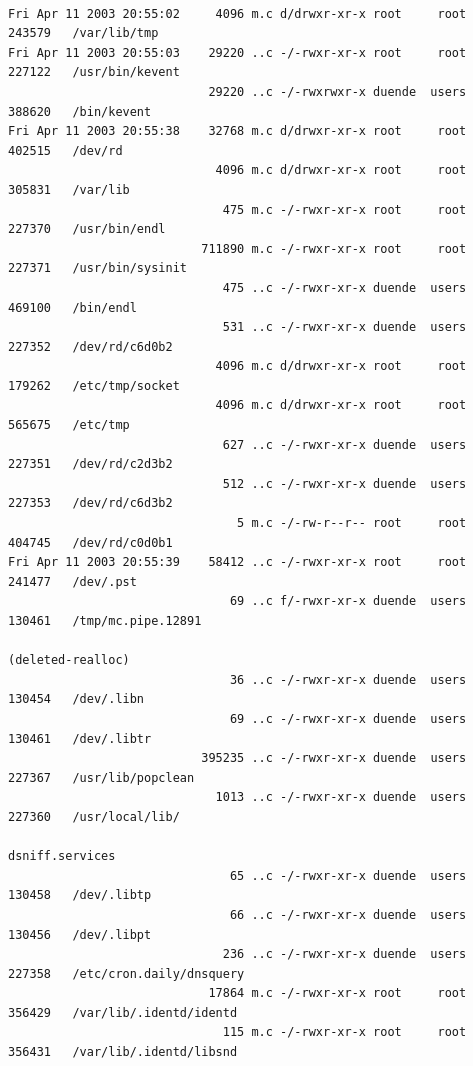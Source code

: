 {\footnotesize
\begin{lstlisting}[style=terminal]

Fri Apr 11 2003 20:55:02     4096 m.c d/drwxr-xr-x root     root     243579   /var/lib/tmp
Fri Apr 11 2003 20:55:03    29220 ..c -/-rwxr-xr-x root     root     227122   /usr/bin/kevent
                            29220 ..c -/-rwxrwxr-x duende  users    388620   /bin/kevent
Fri Apr 11 2003 20:55:38    32768 m.c d/drwxr-xr-x root     root     402515   /dev/rd
                             4096 m.c d/drwxr-xr-x root     root     305831   /var/lib
                              475 m.c -/-rwxr-xr-x root     root     227370   /usr/bin/endl
                           711890 m.c -/-rwxr-xr-x root     root     227371   /usr/bin/sysinit
                              475 ..c -/-rwxr-xr-x duende  users    469100   /bin/endl
                              531 ..c -/-rwxr-xr-x duende  users    227352   /dev/rd/c6d0b2
                             4096 m.c d/drwxr-xr-x root     root     179262   /etc/tmp/socket
                             4096 m.c d/drwxr-xr-x root     root     565675   /etc/tmp
                              627 ..c -/-rwxr-xr-x duende  users    227351   /dev/rd/c2d3b2
                              512 ..c -/-rwxr-xr-x duende  users    227353   /dev/rd/c6d3b2
                                5 m.c -/-rw-r--r-- root     root     404745   /dev/rd/c0d0b1
Fri Apr 11 2003 20:55:39    58412 ..c -/-rwxr-xr-x root     root     241477   /dev/.pst
                               69 ..c f/-rwxr-xr-x duende  users    130461   /tmp/mc.pipe.12891 
                                                                  (deleted-realloc)
                               36 ..c -/-rwxr-xr-x duende  users    130454   /dev/.libn
                               69 ..c -/-rwxr-xr-x duende  users    130461   /dev/.libtr
                           395235 ..c -/-rwxr-xr-x duende  users    227367   /usr/lib/popclean
                             1013 ..c -/-rwxr-xr-x duende  users    227360   /usr/local/lib/
                                                                  dsniff.services
                               65 ..c -/-rwxr-xr-x duende  users    130458   /dev/.libtp
                               66 ..c -/-rwxr-xr-x duende  users    130456   /dev/.libpt
                              236 ..c -/-rwxr-xr-x duende  users    227358   /etc/cron.daily/dnsquery
                            17864 m.c -/-rwxr-xr-x root     root     356429   /var/lib/.identd/identd
                              115 m.c -/-rwxr-xr-x root     root     356431   /var/lib/.identd/libsnd

\end{lstlisting}}
